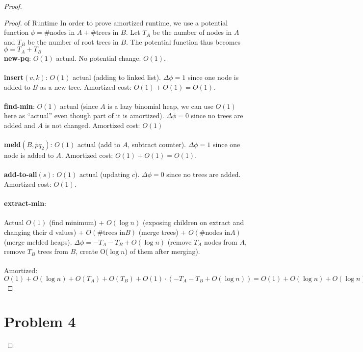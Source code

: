 \documentclass{article}
\theoremstyle{casestyle}
\begin{document}
\begin{proof}
  \begin{proof} of Runtime
    In order to prove amortized runtime, we use a potential function $\phi=\text{\# nodes in } A + \text{\# trees in } B$. Let $T_A$ be the number of nodes in $A$ and $T_B$ be the number of root trees in $B$. The potential function thus becomes $\phi=T_A+T_B$  \\
    \textbf{new-pq}: $O(1)$ actual. No potential change. $O(1)$.\\\\
    \textbf{insert}$(v,k)$: $O(1)$ actual (adding to linked list). $\Delta \phi = 1$ since one node is added to $B$ as a new tree. Amortized cost: $O(1) + O(1) = O(1)$.\\\\
    \textbf{find-min}: $O(1)$ actual (since $A$ is a lazy binomial heap, we can use $O(1)$ here as ``actual'' even though part of it is amortized). $\Delta \phi = 0$ since no trees are added and $A$ is not changed. Amortized cost: $O(1)$\\\\
    \textbf{meld}$(B, p q_2)$: $O(1)$ actual (add to $A$, subtract counter). $\Delta \phi = 1$ since one node is added to $A$.  Amortized cost: $O(1) + O(1) = O(1)$. \\\\
    \textbf{add-to-all}$(s)$: $O(1)$ actual (updating $c$). $\Delta \phi = 0$ since no trees are added. Amortized cost: $O(1)$.\\\\
    \textbf{extract-min}: \\\\ Actual $O(1)$ (find minimum) + $O(\log n)$ (exposing children on extract and changing their d values) + $O(\text{\# trees in} B)$ (merge trees) + $O(\text{\# nodes in} A)$ (merge melded heaps). $\Delta \phi = -T_A-T_B + O(\log n)$ (remove $T_A$ nodes from $A$, remove $T_B$ trees from $B$, create O($\log n$) of them after merging). \\\\ Amortized: $O(1) + O(\log n) + O(T_A) + O(T_B) + O(1) \cdot (-T_A - T_B + O(\log n)) = O(1) + O(\log n) + O(\log n) = O(\log n)$
  \end{proof}

  \newpage

  \section*{Problem 4}


\end{proof}
\end{document}
